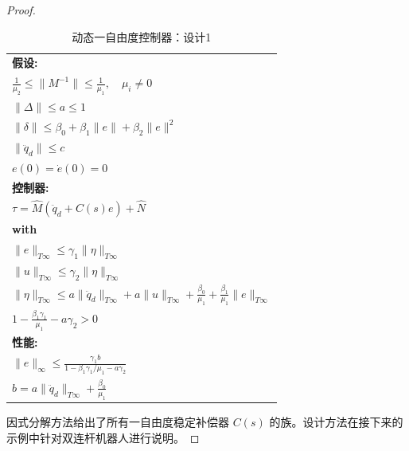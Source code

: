 \documentclass[UTF8,12pt,a4paper]{ctexart}
\begin{document}
\begin{proof}
\begin{table}[htbp]
\centering
\caption{动态一自由度控制器：设计1}
\label{tab:5.2.3}
\begin{tabular}{@{}l@{}}
\toprule
\textbf{假设:} \\
\quad $\displaystyle \frac{1}{\mu_2} \leq \|M^{-1}\| \leq \frac{1}{\mu_1}, \quad \mu_i \neq 0$ \\[1em]
\quad $\|\Delta\| \leq a \leq 1$ \\[0.8em]
\quad $\|\delta\| \leq \beta_0 + \beta_1\|e\| + \beta_2\|e\|^2$ \\[0.8em]
\quad $\|\ddot{q}_d\| \leq c$ \\[0.8em]
\quad $e(0) = \dot{e}(0) = 0$ \\[1em]
\midrule
\textbf{控制器:} \\
\quad $\tau = \hat{M}(\ddot{q}_d + C(s)e) + \hat{N}$ \\[1em]
\quad \textbf{with} \\[0.5em]
\quad $\|e\|_{T\infty} \leq \gamma_1\|\eta\|_{T\infty}$ \\[0.5em]
\quad $\|u\|_{T\infty} \leq \gamma_2\|\eta\|_{T\infty}$ \\[0.5em]
\quad $\|\eta\|_{T\infty} \leq a\|\ddot{q}_d\|_{T\infty} + a\|u\|_{T\infty} + \frac{\beta_0}{\mu_1} + \frac{\beta_1}{\mu_1}\|e\|_{T\infty}$ \\[0.8em]
\quad $1 - \frac{\beta_1\gamma_1}{\mu_1} - a\gamma_2 > 0$ \\[1em]
\midrule
\textbf{性能:} \\
\quad $\displaystyle \|e\|_\infty \leq \frac{\gamma_1 b}{1 - \beta_1\gamma_1/\mu_1 - a\gamma_2}$ \\[0.8em]
\quad $\displaystyle b = a\|\ddot{q}_d\|_{T\infty} + \frac{\beta_0}{\mu_1}$ \\
\bottomrule
\end{tabular}
\end{table}

因式分解方法给出了所有一自由度稳定补偿器 $C(s)$ 的族。设计方法在接下来的示例中针对双连杆机器人进行说明。
\end{proof}
\end{document}
